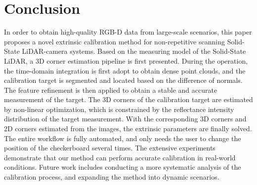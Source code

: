 \documentclass[journal]{vgtc}
\begin{document}
\section{Conclusion}


In order to obtain high-quality RGB-D data from large-scale scenarios, this paper proposes a novel extrinsic calibration method for non-repetitive scanning Solid-State LiDAR-camera systems. Based on the measuring model of the Solid-State LiDAR, a 3D corner estimation pipeline is first presented. During the operation, the time-domain integration is first adopt to obtain dense point clouds, and the calibration target is segmented and located based on the difference of normals. The feature refinement is then applied to obtain a stable and accurate measurement of the target. The 3D corners of the calibration target are estimated by non-linear optimization, which is constrained by the reflectance intensity distribution of the target measurement. With the corresponding 3D corners and 2D corners estimated from the images, the extrinsic parameters are finally solved. The entire workflow is fully automated, and only needs the user to change the position of the checkerboard several times. The extensive experiments demonstrate that our method can perform accurate calibration in real-world conditions. Future work includes conducting a more systematic analysis of the calibration process, and expanding the method into dynamic scenarios. 

 


\end{document}
